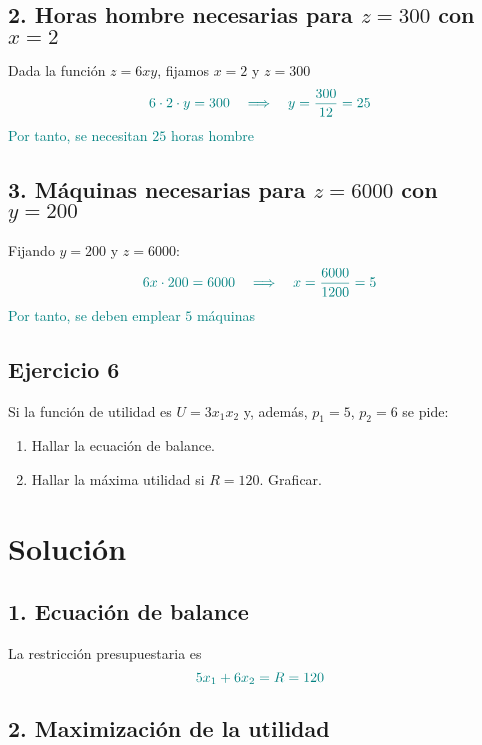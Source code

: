 \documentclass{article}
\begin{document}
\subsection*{2. Horas hombre necesarias para \(z = 300\) con \(x = 2\)}

Dada la función \(z = 6xy\), fijamos \(x = 2\) y \(z = 300\)
\[
\color{teal}
6 \cdot 2 \cdot y = 300
\quad\Longrightarrow\quad
y = \frac{300}{12} = 25
\]
\textcolor{teal}{Por tanto, se necesitan \(25\) horas hombre}

\bigskip

\subsection*{3. Máquinas necesarias para \(z = 6000\) con \(y = 200\)}

Fijando \(y = 200\) y \(z = 6000\):
\[
\color{teal}
6x \cdot 200 = 6000
\quad\Longrightarrow\quad
x = \frac{6000}{1200} = 5
\]
\textcolor{teal}{Por tanto, se deben emplear \(5\) máquinas}

\newpage

\subsection{Ejercicio 6}

Si la función de utilidad es \( U = 3x_1 x_2 \) y, además, \( p_1 = 5 \), \( p_2 = 6 \) se pide:

\begin{enumerate}
    \item Hallar la ecuación de balance.
    \item Hallar la máxima utilidad si \( R = 120 \). Graficar.
\end{enumerate}

\newpage
\section*{Solución}

\subsection*{1. Ecuación de balance}

La restricción presupuestaria es
\[
\color{teal}
5x_1 + 6x_2 = R = 120
\]

\subsection*{2. Maximización de la utilidad}
\end{document}
